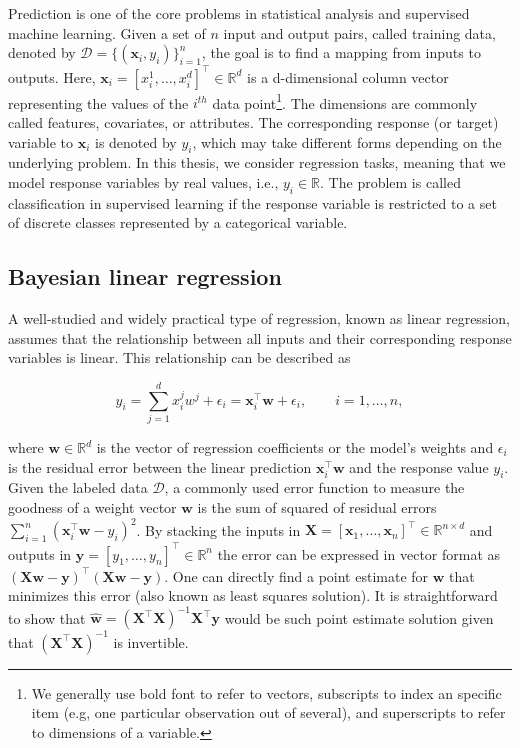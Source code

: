 \documentclass[dissertation,math,vertlayout,pdfa,colorlinks]{aaltoseries}
\newcommand{\bw}{\bm{w}}
\newcommand{\bX}{\bm{X}}
\newcommand{\by}{\bm{y}}
\newcommand{\bD}{\mathcal{D}}
\newcommand{\tp}{^{\top}}
\begin{document}
Prediction is one of the core problems in statistical analysis and supervised machine learning. Given a set of $n$ input and output pairs, called training data, denoted by $\bD= \{(\bm{x}_i,y_i)\}_{i=1}^{n}$, the goal is to find a mapping from inputs to outputs. Here, $\bm{x}_i = [x_i^1,\ldots,x_i^d]\tp \in \mathbb{R}^d$ is a d-dimensional column vector representing the values of the $i^{th}$ data point\footnote{We generally use bold font to refer to vectors, subscripts to index an specific item (e.g, one particular observation out of several), and superscripts to refer to dimensions of a variable.}. The dimensions are commonly called features, covariates, or attributes. The corresponding response (or target) variable to $\bm{x}_i$ is denoted by $y_i$, which may take different forms depending on the underlying problem. In this thesis, we consider regression tasks, meaning that we model response variables by real values, i.e., $y_i \in \mathbb{R}$. The problem is called classification in supervised learning if the response variable is restricted to a set of discrete classes represented by a categorical variable. 

\subsection{Bayesian linear regression}

A well-studied and widely practical type of regression, known as linear regression, assumes that the relationship between all inputs and their corresponding response variables is linear. This relationship can be described as 

\begin{equation}\label{Eq:linear_reg_no_Bayes}
y_i= \sum_{j=1}^{d}x_{i}^{j} w^{j}+\epsilon_i=\bm{x}_i\tp\bw+\epsilon_i, \qquad i=1,\ldots,n,
\end{equation}

\noindent where $\bw \in \mathbb{R}^d$ is the vector of regression coefficients or the model's weights and $\epsilon_i$ is the residual error between the linear prediction $\bm{x}_i\tp\bw$ and the response value $y_i$. Given the labeled data $\bD$, a commonly used error function to measure the goodness of a  weight vector $\bw$ is the sum of squared of residual errors $\sum_{i=1}^n(\bm{x}_i\tp\bw- y_i)^2$. By stacking the inputs in $\bX = [\bm{x}_1,\ldots,\bm{x}_n]\tp \in \mathbb{R}^{n\times d}$ and outputs in $\by = [y_1,\ldots,y_n]\tp \in \mathbb{R}^n$ the error can be expressed in vector format as $(\bX\bw- \by)\tp(\bX\bw- \by)$. 
One can directly find a point estimate for $\bw$ that minimizes this error (also known as least squares solution). 
It is straightforward to show that $\hat{\bw} = (\bX \tp \bX)^{-1}\bX\tp \by$  would be such point estimate solution given that $(\bX \tp \bX)^{-1}$ is invertible.  
\end{document}
